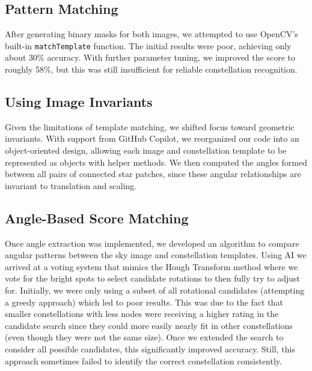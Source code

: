\documentclass[a4paper,11pt]{article}
\begin{document}
	\subsection{Pattern Matching}
	After generating binary masks for both images, we attempted to use OpenCV’s built-in \texttt{matchTemplate} function. The initial results were poor, achieving only about 30\% accuracy. With further parameter tuning, we improved the score to roughly 58\%, but this was still insufficient for reliable constellation recognition.
	
	\subsection{Using Image Invariants}
	Given the limitations of template matching, we shifted focus toward geometric invariants. With support from GitHub Copilot, we reorganized our code into an object-oriented design, allowing each image and constellation template to be represented as objects with helper methods. We then computed the angles formed between all pairs of connected star patches, since these angular relationships are invariant to translation and scaling.
	
	\subsection{Angle-Based Score Matching}
	Once angle extraction was implemented, we developed an algorithm to compare angular patterns between the sky image and constellation templates. Using AI we arrived at a voting system that mimics the Hough Transform method where we vote for the bright spots to select candidate rotations to then fully try to adjust for. Initially, we were only using a subset of all rotational candidates (attempting a greedy approach) which led to poor results. This was due to the fact that smaller constellations with less nodes were receiving a higher rating in the candidate search since they could more easily nearly fit in other constellations (even though they were not the same size). Once we extended the search to consider all possible candidates, this significantly improved accuracy. Still, this approach sometimes failed to identify the correct constellation consistently.
	
\end{document}
